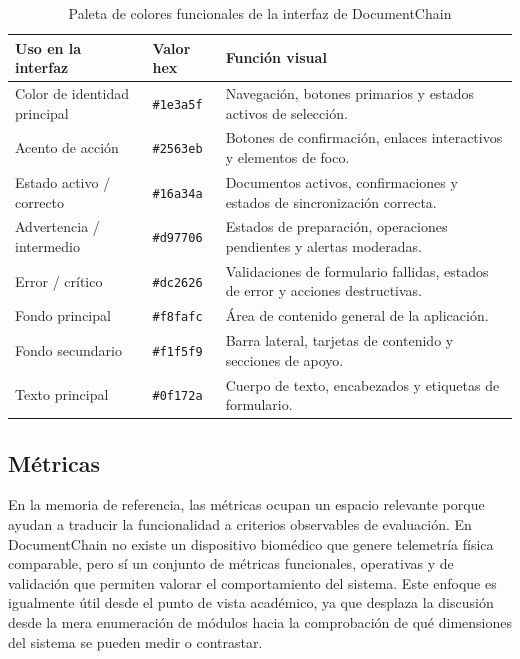 \documentclass[11pt, a4paper]{article}
\begin{document}
\begin{table}[H]
    \centering
    \small
    \begin{tabular}{|p{4cm}|p{2.5cm}|p{6.5cm}|}
    \hline
    \textbf{Uso en la interfaz} & \textbf{Valor hex} & \textbf{Función visual} \\
    \hline
    Color de identidad principal & \texttt{\#1e3a5f} & Navegación, botones primarios y estados activos de selección. \\
    \hline
    Acento de acción & \texttt{\#2563eb} & Botones de confirmación, enlaces interactivos y elementos de foco. \\
    \hline
    Estado activo / correcto & \texttt{\#16a34a} & Documentos activos, confirmaciones y estados de sincronización correcta. \\
    \hline
    Advertencia / intermedio & \texttt{\#d97706} & Estados de preparación, operaciones pendientes y alertas moderadas. \\
    \hline
    Error / crítico & \texttt{\#dc2626} & Validaciones de formulario fallidas, estados de error y acciones destructivas. \\
    \hline
    Fondo principal & \texttt{\#f8fafc} & Área de contenido general de la aplicación. \\
    \hline
    Fondo secundario & \texttt{\#f1f5f9} & Barra lateral, tarjetas de contenido y secciones de apoyo. \\
    \hline
    Texto principal & \texttt{\#0f172a} & Cuerpo de texto, encabezados y etiquetas de formulario. \\
    \hline
    \end{tabular}
    \caption{Paleta de colores funcionales de la interfaz de DocumentChain}
    \label{tab:paleta-colores}
\end{table}

\subsection{Métricas}

En la memoria de referencia, las métricas ocupan un espacio relevante porque ayudan a traducir la funcionalidad a criterios observables de evaluación. En DocumentChain no existe un dispositivo biomédico que genere telemetría física comparable, pero sí un conjunto de métricas funcionales, operativas y de validación que permiten valorar el comportamiento del sistema. Este enfoque es igualmente útil desde el punto de vista académico, ya que desplaza la discusión desde la mera enumeración de módulos hacia la comprobación de qué dimensiones del sistema se pueden medir o contrastar.
\end{document}
